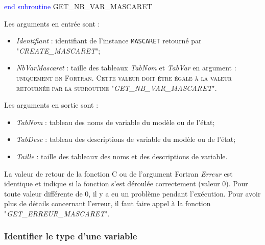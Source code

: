 \documentclass[a4paper,11pt]{article}
\begin{document}
    \textcolor{blue}{end subroutine} GET\_NB\_VAR\_MASCARET

 \vspace{0.5cm}
 
  Les arguments en entr\'ee sont :
 
 \vspace{0.5cm}
 
 \begin{itemize}
 
    \item \textit{Identifiant} : identifiant de l'instance \texttt{MASCARET} retourn\'e par "\textit{CREATE\_MASCARET}";
    \vspace{0.5cm}
    \item \textit{NbVarMascaret} : taille des tableaux \textit{TabNom} et \textit{TabVar} en argument : \textsc{uniquement en Fortran. Cette valeur doit \^etre \'egale \`a la valeur retourn\'ee par la subroutine "\textit{GET\_NB\_VAR\_MASCARET}"}.
 \end{itemize}
 
 \vspace{0.5cm}
 
 Les arguments en sortie sont :
 
 \vspace{0.5cm}
 
 \begin{itemize}

    \item \textit{TabNom} : tableau des noms de variable du mod\`ele ou de l'\'etat;
    \item \textit{TabDesc} : tableau des descriptions de variable du mod\`ele ou de l'\'etat;
    \item \textit{Taille} : taille des tableaux des noms et des descriptions de variable. 
 
 \end{itemize}

 \vspace{0.5cm}
 
  La valeur de retour de la fonction C ou de l'argument Fortran \textit{Erreur} est identique et indique si la fonction s'est d\'eroul\'ee correctement (valeur 0). Pour toute valeur diff\'erente de 0, il y a eu un probl\`eme pendant l'ex\'ecution. Pour avoir plus de d\'etails concernant l'erreur, il faut faire appel \`a la fonction "\textit{GET\_ERREUR\_MASCARET}".

\subsubsection{Identifier le type d'une variable}
\end{document}
